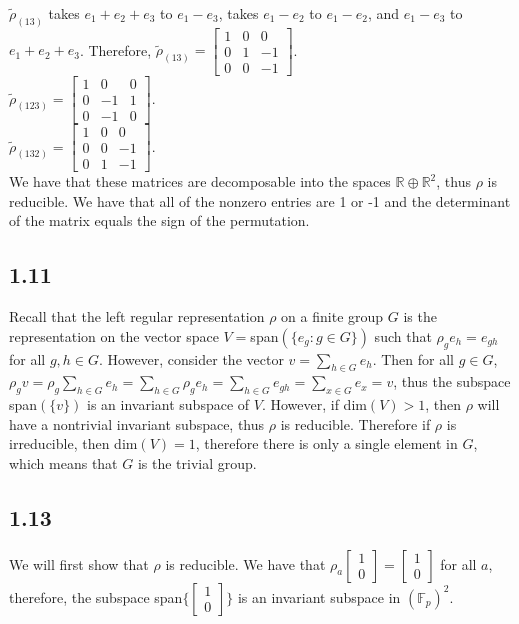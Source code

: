 \documentclass[]{article}
\begin{document}
$\tilde{\rho}_{(13)}$ takes $e_1 + e_2 + e_3$ to $e_1 - e_3$, takes $e_1 - e_2$ to $e_1 - e_2$, and $e_1 - e_3$ to $e_1 + e_2 + e_3$. Therefore, 
$\tilde{\rho}_{(13)} = 
\begin{bmatrix}
	1 & 0 & 0\\
	0 & 1 & -1\\
	0 & 0 & -1
\end{bmatrix}
$.
\\
$\tilde{\rho}_{(123)} = 
\begin{bmatrix}
	1 & 0 & 0\\
	0 & -1 & 1\\
	0 & -1 & 0
\end{bmatrix}
$.
\\
$\tilde{\rho}_{(132)} = 
\begin{bmatrix}
	1 & 0 & 0\\
	0 & 0 & -1\\
	0 & 1 & -1
\end{bmatrix}
$.
\\
We have that these matrices are decomposable into the spaces $\mathbb{R} \oplus \mathbb{R}^2$, thus $\rho$ is reducible. We have that all of the nonzero entries are 1 or -1 and the determinant of the matrix equals the sign of the permutation.

\subsection*{1.11}
Recall that the left regular representation $\rho$ on a finite group $G$ is the representation on the vector space $V=$span$(\lbrace e_g : g \in G \rbrace)$ such that $\rho_g e_h = e_{gh}$ for all $g, h \in G$. However, consider the vector $v = \sum_{h \in G} e_h$. Then for all $g \in G$, $\rho_g v = \rho_g \sum_{h \in G} e_h = \sum_{h \in G} \rho_g e_h = \sum_{h \in G} e_{gh} = \sum_{x \in G} e_x = v$, thus the subspace span$(\lbrace v \rbrace)$ is an invariant subspace of $V$. However, if dim$(V) > 1$, then $\rho$ will have a nontrivial invariant subspace, thus $\rho$ is reducible. Therefore if $\rho$ is irreducible, then dim$(V) = 1$, therefore there is only a single element in $G$, which means that $G$ is the trivial group.
\subsection*{1.13}
We will first show that $\rho$ is reducible. We have that $\rho_a \begin{bmatrix}
	1\\
	0
\end{bmatrix}
= \begin{bmatrix}
	1\\
	0
\end{bmatrix}
$ for all $a$, therefore, the subspace span$\lbrace \begin{bmatrix}
	1\\
	0
\end{bmatrix} \rbrace$ is an invariant subspace in $(\mathbb{F}_p)^2$. 
\end{document}
